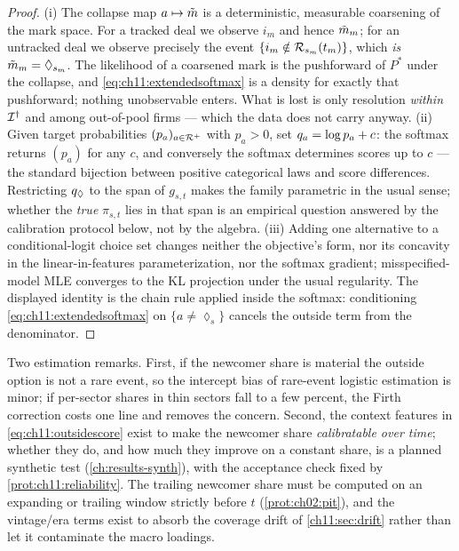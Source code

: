 \begin{proof}
(i) The collapse map $a \mapsto \tilde{m}$ is a deterministic,
measurable coarsening of the mark space. For a tracked deal we observe
$i_m$ and hence $\tilde{m}_m$; for an untracked deal we observe
precisely the event $\{i_m \notin \mathcal{R}_{s_m}(t_m)\}$, which \emph{is}
$\tilde{m}_m = \lozenge_{s_m}$. The likelihood of a coarsened mark is
the pushforward of $P^*$ under the collapse, and
\cref{eq:ch11:extendedsoftmax} is a density for exactly that pushforward;
nothing unobservable enters. What is lost is only resolution
\emph{within} $\mathcal{I}^{\dagger}$ and among out-of-pool firms --- which
the data does not carry anyway.
(ii) Given target probabilities $(p_a)_{a \in \mathcal{R}^+}$ with
$p_a > 0$, set $q_a = \log p_a + c$: the softmax returns $(p_a)$
for any $c$, and conversely the softmax determines scores up to $c$
--- the standard bijection between positive categorical laws and score
differences. Restricting $q_{\lozenge}$ to the span of $g_{s,t}$
makes the family parametric in the usual sense; whether the \emph{true}
$\pi_{s,t}$ lies in that span is an empirical question answered by the
calibration protocol below, not by the algebra.
(iii) Adding one alternative to a conditional-logit choice set changes
neither the objective's form, nor its concavity in the linear-in-features
parameterization, nor the softmax gradient; misspecified-model MLE
converges to the KL projection under the usual regularity. The displayed
identity is the chain rule applied inside the softmax:
conditioning \cref{eq:ch11:extendedsoftmax} on $\{a \ne \lozenge_s\}$
cancels the outside term from the denominator.
\end{proof}

Two estimation remarks. First, if the newcomer share is material the
outside option is not a rare event, so the intercept bias of rare-event
logistic estimation \citep{kingzeng2001} is minor; if per-sector shares
in thin sectors fall to a few percent, the Firth correction
\citep{firth1993} costs one line and removes the concern. Second, the
context features in \cref{eq:ch11:outsidescore} exist to make the
newcomer share \emph{calibratable over time}; whether they do, and how
much they improve on a constant share, is a planned synthetic test
(\cref{ch:results-synth}), with the acceptance check fixed by
\cref{prot:ch11:reliability}. The trailing newcomer share
must be computed on an expanding or trailing window strictly before $t$
(\cref{prot:ch02:pit}), and the vintage/era terms exist to absorb the
coverage drift of \cref{ch11:sec:drift} rather than let it contaminate
the macro loadings.

